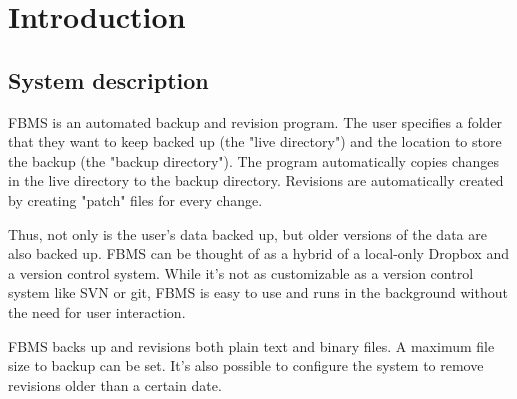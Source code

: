 \documentclass[12pt,a4paper]{article}
\begin{document}
\tableofcontents
\setcounter{tocdepth}{3}
\clearpage

\pagestyle{fancy}
\fancyhf{} %
\renewcommand{\headrulewidth}{0pt} %

\section{Introduction}

\subsection{System description}
FBMS is an automated backup and revision program. The user specifies a folder that they want to keep backed up (the "live directory") and the location to store the backup (the "backup directory"). The program automatically copies changes in the live directory to the backup directory. Revisions are automatically created by creating "patch" files for every change.

Thus, not only is the user's data backed up, but older versions of the data are also backed up. FBMS can be thought of as a hybrid of a local-only Dropbox\cite{dropbox} and a version control system. While it's not as customizable as a version control system like SVN\cite{svn} or git\cite{git}, FBMS is easy to use and runs in the background without the need for user interaction.

FBMS backs up and revisions both plain text and binary files. A maximum file size to backup can be set. It's also possible to configure the system to remove revisions older than a certain date.
\end{document}
